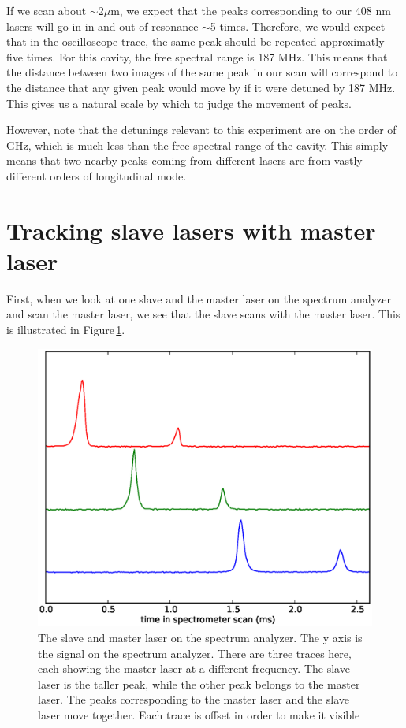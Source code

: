 If we scan about $\sim$2$\mu$m, we expect that the peaks corresponding to our 408 nm lasers will go in in and out of resonance $\sim$5 times. Therefore, we would expect that in the oscilloscope trace, the same peak should be repeated approximatly five times. For this cavity, the free spectral range is 187 MHz. This means that the distance between two images of the same peak in our scan will correspond to the distance that any given peak would move by if it were detuned by 187 MHz. This gives us a natural scale by which to judge the movement of peaks. 

However, note that the detunings relevant to this experiment are on the order of GHz, which is much less than the free spectral range of the cavity. This simply means that two nearby peaks coming from different lasers are from vastly different orders of longitudinal mode. 


\section{Tracking slave lasers with master laser}

First, when we look at one slave and the master laser on the spectrum analyzer and scan the master laser, we see that the slave scans with the master laser. This is illustrated in Figure\,\ref{fig:slaveMaster}.

\begin{figure}
    \centerline{\includegraphics{Slave2AndMasterScanningMaster}}
    \caption[Slave laser and master laser frequencies tracking together]{\label{fig:slaveMaster}
    The slave and master laser on the spectrum analyzer. The y axis is the signal on the spectrum analyzer. There are three traces here, each showing the master laser at a different frequency. The slave laser is the taller peak, while the other peak belongs to the master laser. The peaks corresponding to the master laser and the slave laser move together. Each trace is offset in order to make it visible}
\end{figure}

